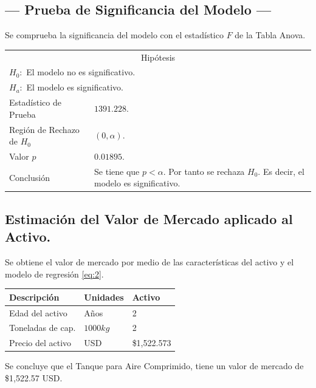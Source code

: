 \subsection{\centering --- Prueba de Significancia del Modelo ---} %
Se comprueba la significancia del modelo con el estadístico \(F\) de la Tabla Anova.
\begin{center}
  \begin{tabular}{|l|p{6cm}|}
    \cline{1-2}
    \multicolumn{2}{|c|}{Hipótesis}\\ \cline{1-2}
    \multicolumn{2}{|l|}{\(H_0:\) El modelo no es significativo.} \\ 
    \multicolumn{2}{|l|}{\(H_a:\) El modelo es significativo.} \\ \cline{1-2}
    Estadístico de Prueba & \(1391.228\).\\ \cline{1-2} 
		Región de Rechazo de \(H_0\) & \((0, \alpha )\).\\ \cline{1-2} 
    Valor \(p\) & \(0.01895\).\\ \cline{1-2} 
    Conclusión & Se tiene que \(p<\alpha\). \newline 
		Por tanto se rechaza \(H_0\). \newline 
		Es decir, el modelo es significativo.\\ \cline{1-2} 
  \end{tabular}
\end{center} 

\subsection{\centering Estimación del Valor de Mercado aplicado al Activo.} %
Se obtiene el valor de mercado por medio de las características del activo y el modelo de regresión \eqref{eq:2}.
\begin{center}
  \begin{tabular}{|l|l|l|}
    \hline 
		Descripción   & Unidades  & Activo \\ \hline 
    Edad del activo    & Años      & 2      \\ \hline 
		Toneladas de cap.  & \(1000kg\) & 2   \\ \hline 
		Precio del activo   & USD       & \$1,522.573  \\ \hline 
  \end{tabular}
\end{center} 
Se concluye que el Tanque para Aire Comprimido, tiene un valor de mercado de 
\$1,522.57 USD.

